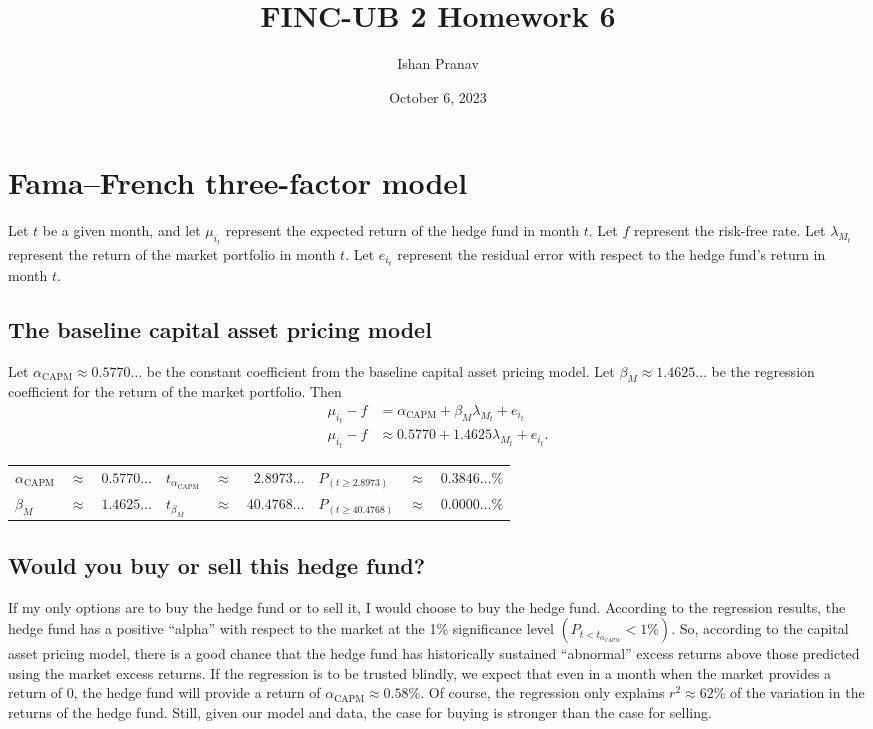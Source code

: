 \documentclass[12pt]{article}
\title{FINC-UB 2 Homework 6}
\author{Ishan Pranav}
\date{October 6, 2023}
\begin{document}
\maketitle
\section*{Fama--French three-factor model}
Let $t$ be a given month, and let $\mu_{i_t}$ represent the expected return of the hedge fund in month $t$. Let $f$ represent the risk-free rate. Let $\lambda_{M_t}$ represent the return of the market portfolio in month $t$. Let $e_{i_t}$ represent the residual error with respect to the hedge fund's return in month $t$. 
\subsection{The baseline capital asset pricing model}
Let $\alpha_{\mathrm{CAPM}}\approx 0.5770\dots$ be the constant coefficient from the baseline capital asset pricing model. Let $\beta_M\approx 1.4625\dots$ be the regression coefficient for the return of the market portfolio. Then
\begin{align*}
\mu_{i_t}-f&=\alpha_{\mathrm{CAPM}}+\beta_M\lambda_{M_t}+e_{i_t}\\
\mu_{i_t}-f&\approx 0.5770+1.4625\lambda_{M_t}+e_{i_t}.
\end{align*}
\begin{center}
\begin{tabular}{lcr|lcr|lcr}
$\alpha_{\mathrm{CAPM}}$&$\approx$&$0.5770\dots$&$t_{\alpha_{\mathrm{CAPM}}}$&$\approx$&$2.8973\dots$&$P_{(t\geq 2.8973)}$&$\approx$&$0.3846\dots\%$\\
$\beta_M$&$\approx$&$1.4625\dots$&$t_{\beta_M}$&$\approx$&$40.4768\dots$&$P_{(t\geq 40.4768)}$&$\approx$&$0.0000\dots\%$
\end{tabular}
\end{center}
\subsection{Would you buy or sell this hedge fund?}
If my only options are to buy the hedge fund or to sell it, I would choose to buy the hedge fund. According to the regression results, the hedge fund has a positive ``alpha'' with respect to the market at the 1\% significance level $\left(P_{t<t_{\alpha_{\mathrm{CAPM}}}}<1\%\right)$. So, according to the capital asset pricing model, there is a good chance that the hedge fund has historically sustained ``abnormal'' excess returns above those predicted using the market excess returns. If the regression is to be trusted blindly, we expect that even in a month when the market provides a return of 0, the hedge fund will provide a return of $\alpha_{\mathrm{CAPM}}\approx 0.58\%$. Of course, the regression only explains $r^2\approx 62\%$ of the variation in the returns of the hedge fund. Still, given our model and data, the case for buying is stronger than the case for selling.
\end{document}
